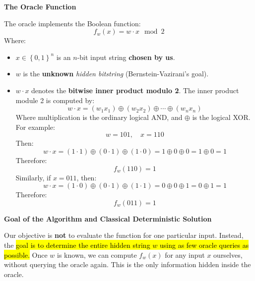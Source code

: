 \highspace
\begin{flushleft}
    \textcolor{Green3}{ \textbf{The Oracle Function}}
\end{flushleft}
The oracle implements the Boolean function:
\begin{equation*}
    f_w (x) = w \cdot x \mod 2
\end{equation*}
Where:
\begin{itemize}
    \item[\textcolor{Green3}{\faIcon{check}}] $x \in \left\{0,1\right\}^{n}$ is an $n$-bit input string \textbf{chosen by us}.
    \item[\textcolor{Green3}{\faIcon{question-circle}}] $w$ is the \textbf{unknown} \emph{hidden bitstring} (Bernstein-Vazirani's goal).
    \item $w \cdot x$ denotes the \textbf{bitwise inner product modulo 2}. The inner product module 2 is computed by:
    \begin{equation*}
        w \cdot x = \left(w_1 x_1\right) \oplus \left(w_2 x_2\right) \oplus \cdots \oplus \left(w_n x_n\right)
    \end{equation*}
    Where multiplication is the ordinary logical AND, and $\oplus$ is the logical XOR. For example:
    \begin{equation*}
        w = 101, \quad x = 110
    \end{equation*}
    Then:
    \begin{equation*}
        w \cdot x = \left(1 \cdot 1\right) \oplus \left(0 \cdot 1\right) \oplus \left(1 \cdot 0\right) = 1 \oplus 0 \oplus 0 = 1 \oplus 0 = 1
    \end{equation*}
    Therefore:
    \begin{equation*}
        f_w (110) = 1
    \end{equation*}
    Similarly, if $x = 011$, then:
    \begin{equation*}
        w \cdot x = \left(1 \cdot 0\right) \oplus \left(0 \cdot 1\right) \oplus \left(1 \cdot 1\right) = 0 \oplus 0 \oplus 1 = 0 \oplus 1 = 1
    \end{equation*}
    Therefore:
    \begin{equation*}
        f_w (011) = 1
    \end{equation*}
\end{itemize}

\highspace
\begin{flushleft}
    \textcolor{Green3}{ \textbf{Goal of the Algorithm and Classical Deterministic Solution}}
\end{flushleft}
Our objective is \textbf{not} to evaluate the function for one particular input. Instead, the \hl{goal is to determine the entire hidden string $w$ using as few oracle queries as possible.} Once $w$ is known, we can compute $f_w (x)$ for any input $x$ ourselves, without querying the oracle again. This is the only information hidden inside the oracle.

